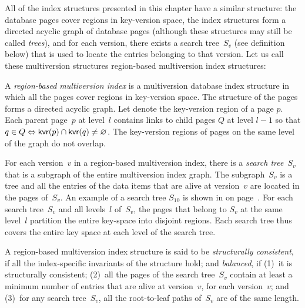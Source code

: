 All of the index structures presented in this chapter have a similar
structure: the database pages cover regions in key-version space, the
index structures form a directed acyclic graph of database pages (although
these structures may still be called \emph{trees}), and for each
version, there exists a search tree~$S_v$ (see definition below) that is
used to locate the entries belonging to that version.
Let us call these multiversion structures region-based multiversion index
structures:

\thmskip
\begin{definition}
A \emph{region-based multiversion index} is a multiversion database
index structure in which all the pages cover regions in key-version space.
The structure of the pages forms a directed acyclic graph.
Let  denote the key-version region of a page $p$. 
Each parent page~$p$ at level~$l$ contains links to child pages $Q$ at
level $l-1$ so that $q \in Q \Leftrightarrow \text{\textsf{kvr}}(p) \cap \text{\textsf{kvr}}(q)
\neq \varnothing$. 
The key-version regions of pages on the same level of the graph do not
overlap.
\end{definition}
\thmskip
\begin{definition}
\label{def:search-tree}
For each version~$v$ in a region-based multiversion index, there is
a \emph{search tree}~$S_v$ that is a subgraph of the entire multiversion
index graph.
The subgraph~$S_v$ is a tree and all the entries of the data items that are
alive at version~$v$ are located in the pages of~$S_v$. 
An example of a search tree $S_{10}$ is shown in
 on
page~\pageref{fig:sv-mv-index-comparison:mv}.
For each search tree~$S_v$ and all levels~$l$ of~$S_v$, the pages
that belong to $S_v$ at the same level~$l$ partition the entire key-space into
disjoint regions.
Each search tree thus covers the entire key space at each level of the search
tree.
\end{definition}
\thmskip
\begin{definition}
\label{def:consistent-balanced}
A region-based multiversion index structure is said to be \emph{structurally
consistent}, if all the index-specific invariants of the structure
hold; and \emph{balanced}, if 
(1)~it is structurally consistent;
(2)~all the pages of the search tree~$S_v$ contain at least a minimum number
of entries that are alive at version~$v$, for each version~$v$; and
(3)~for any search tree~$S_v$, all the root-to-leaf paths of~$S_v$ are of the
same length.
\end{definition}
\thmskip

